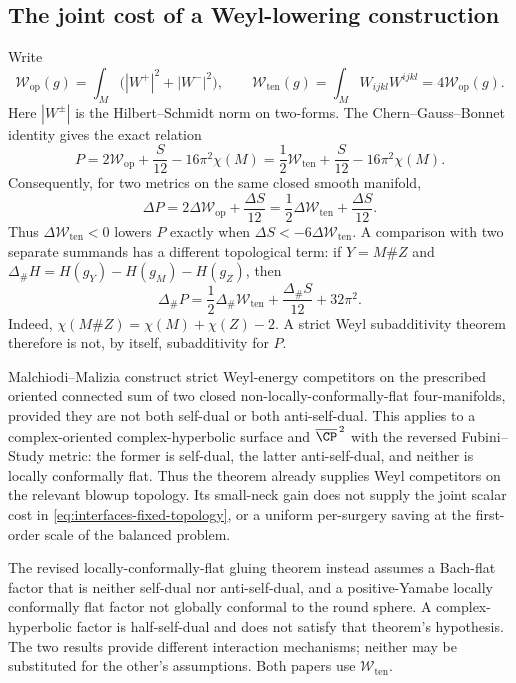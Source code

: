 \subsection{The joint cost of a Weyl-lowering construction}
Write
\[
 \mathcal W_{\mathrm{op}}(g)
   =\int_M\bigl(|W^+|^2+|W^-|^2\bigr),\qquad
 \mathcal W_{\mathrm{ten}}(g)
   =\int_M W_{ijkl}W^{ijkl}=4\mathcal W_{\mathrm{op}}(g).
\]
Here $|W^\pm|$ is the Hilbert--Schmidt norm on two-forms. The
Chern--Gauss--Bonnet identity gives the exact relation
\begin{equation}\label{eq:interfaces-joint-cost}
 P=2\mathcal W_{\mathrm{op}}+\frac{S}{12}-16\pi^2\chi(M)
  =\frac12\mathcal W_{\mathrm{ten}}+\frac{S}{12}-16\pi^2\chi(M).
\end{equation}
Consequently, for two metrics on the same closed smooth manifold,
\begin{equation}\label{eq:interfaces-fixed-topology}
 \Delta P=2\Delta\mathcal W_{\mathrm{op}}+\frac{\Delta S}{12}
         =\frac12\Delta\mathcal W_{\mathrm{ten}}+\frac{\Delta S}{12}.
\end{equation}
Thus $\Delta\mathcal W_{\mathrm{ten}}<0$ lowers $P$ exactly when
$\Delta S<-6\Delta\mathcal W_{\mathrm{ten}}$. A comparison with two
separate summands has a different topological term: if
$Y=M\# Z$ and $\Delta_\# H=H(g_Y)-H(g_M)-H(g_Z)$, then
\begin{equation}\label{eq:interfaces-connected-sum}
 \Delta_\# P=\frac12\Delta_\#\mathcal W_{\mathrm{ten}}
             +\frac{\Delta_\# S}{12}+32\pi^2.
\end{equation}
Indeed, $\chi(M\# Z)=\chi(M)+\chi(Z)-2$. A strict Weyl
subadditivity theorem therefore is not, by itself, subadditivity for $P$.

Malchiodi--Malizia \cite[Theorem 1.1]{MalchiodiMalizia2025}
construct strict Weyl-energy competitors on the prescribed oriented
connected sum of two closed non-locally-conformally-flat four-manifolds,
provided they are not both self-dual or both anti-self-dual.
This applies to a complex-oriented complex-hyperbolic surface and
$\overline{\CP}^{\,2}$ with the reversed Fubini--Study metric:
the former is self-dual, the latter anti-self-dual, and neither is
locally conformally flat. Thus the theorem already supplies Weyl
competitors on the relevant blowup topology. Its small-neck gain does
not supply the joint scalar cost in
\eqref{eq:interfaces-fixed-topology}, or a uniform per-surgery saving
at the first-order scale of the balanced problem.

The revised locally-conformally-flat gluing theorem
\cite[Theorem 1.1]{MalchiodiMalizia2026} instead assumes a Bach-flat
factor that is neither self-dual nor anti-self-dual, and a positive-Yamabe
locally conformally flat factor not globally conformal to the round
sphere. A complex-hyperbolic factor is half-self-dual and does not
satisfy that theorem's hypothesis. The two results provide different
interaction mechanisms; neither may be substituted for the other's
assumptions. Both papers use $\mathcal W_{\mathrm{ten}}$.

